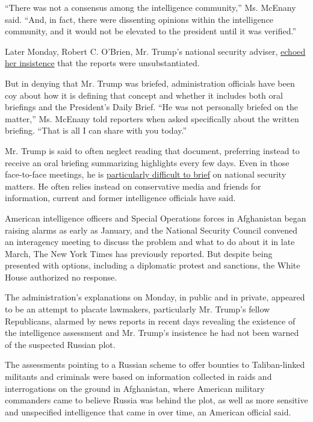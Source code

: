 ``There was not a consensus among the intelligence community,'' Ms.
McEnany said. ``And, in fact, there were dissenting opinions within the
intelligence community, and it would not be elevated to the president
until it was verified.''

Later Monday, Robert C. O'Brien, Mr. Trump's national security adviser,
\href{https://twitter.com/WHNSC/status/1277804151033004032?s=20}{echoed
her insistence} that the reports were unsubstantiated.

But in denying that Mr. Trump was briefed, administration officials have
been coy about how it is defining that concept and whether it includes
both oral briefings and the President's Daily Brief. ``He was not
personally briefed on the matter,'' Ms. McEnany told reporters when
asked specifically about the written briefing. ``That is all I can share
with you today.''

Mr. Trump is said to often neglect reading that document, preferring
instead to receive an oral briefing summarizing highlights every few
days. Even in those face-to-face meetings, he is
\href{https://www.nytimes.com/2020/05/21/us/politics/presidents-daily-brief-trump.html}{particularly
difficult to brief} on national security matters. He often relies
instead on conservative media and friends for information, current and
former intelligence officials have said.

American intelligence officers and Special Operations forces in
Afghanistan began raising alarms as early as January, and the National
Security Council convened an interagency meeting to discuss the problem
and what to do about it in late March, The New York Times has previously
reported. But despite being presented with options, including a
diplomatic protest and sanctions, the White House authorized no
response.

The administration's explanations on Monday, in public and in private,
appeared to be an attempt to placate lawmakers, particularly Mr. Trump's
fellow Republicans, alarmed by news reports in recent days revealing the
existence of the intelligence assessment and Mr. Trump's insistence he
had not been warned of the suspected Russian plot.

The assessments pointing to a Russian scheme to offer bounties to
Taliban-linked militants and criminals were based on information
collected in raids and interrogations on the ground in Afghanistan,
where American military commanders came to believe Russia was behind the
plot, as well as more sensitive and unspecified intelligence that came
in over time, an American official said.


